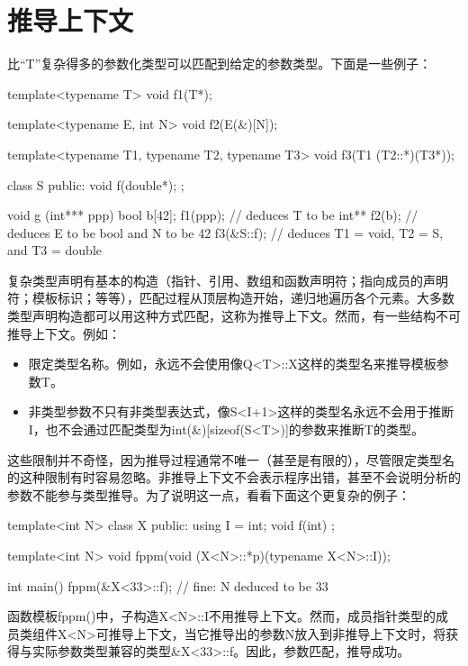 \section{推导上下文}
比“T”复杂得多的参数化类型可以匹配到给定的参数类型。下面是一些例子：

\begin{cpp}
template<typename T>
void f1(T*);

template<typename E, int N>
void f2(E(&)[N]);

template<typename T1, typename T2, typename T3>
void f3(T1 (T2::*)(T3*));

class S {
	public:
	void f(double*);
};

void g (int*** ppp) {
	bool b[42];
	f1(ppp); // deduces T to be int**
	f2(b); // deduces E to be bool and N to be 42
	f3(&S::f); // deduces T1 = void, T2 = S, and T3 = double
}
\end{cpp} 

复杂类型声明有基本的构造（指针、引用、数组和函数声明符；指向成员的声明符；模板标识；等等），匹配过程从顶层构造开始，递归地遍历各个元素。大多数类型声明构造都可以用这种方式匹配，这称为推导上下文。然而，有一些结构不可推导上下文。例如：

\begin{itemize}
\item 
限定类型名称。例如，永远不会使用像Q<T>::X这样的类型名来推导模板参数T。

\item 
非类型参数不只有非类型表达式，像S<I+1>这样的类型名永远不会用于推断I，也不会通过匹配类型为int(\&)[sizeof(S<T>)]的参数来推断T的类型。
\end{itemize}

这些限制并不奇怪，因为推导过程通常不唯一（甚至是有限的），尽管限定类型名的这种限制有时容易忽略。非推导上下文不会表示程序出错，甚至不会说明分析的参数不能参与类型推导。为了说明这一点，看看下面这个更复杂的例子：

\begin{cpp}
template<int N>
class X {
	public:
	using I = int;
	void f(int) {
	}
};

template<int N>
void fppm(void (X<N>::*p)(typename X<N>::I));

int main() {
	fppm(&X<33>::f); // fine: N deduced to be 33
}
\end{cpp}

函数模板fppm()中，子构造X<N>::I不用推导上下文。然而，成员指针类型的成员类组件X<N>可推导上下文，当它推导出的参数N放入到非推导上下文时，将获得与实际参数类型兼容的类型\&X<33>::f。因此，参数匹配，推导成功。

